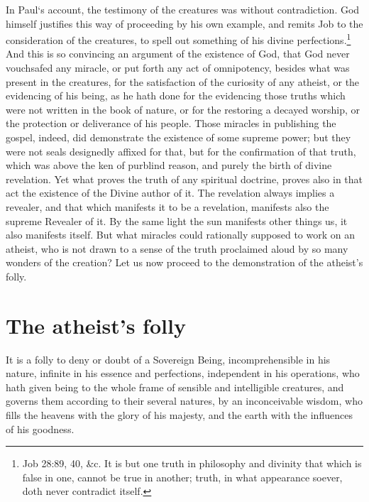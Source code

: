 \documentclass[a5paper]{book}
\begin{document}
In Paul‘s account, the testimony of the creatures was without contradiction. 
God himself justifies this way of proceeding by his own example, 
    and remits Job to the consideration of the creatures, 
    to spell out something of his divine perfections.\footnote{Job 28:89, 40, \&c. 
        It is but one truth in philosophy and divinity
        that which is false in one, 
        cannot be true in another;
        truth, in what appearance soever,
        doth never contradict itself.}
And this is so convincing an argument of the existence of God, 
    that God never vouchsafed any miracle,
    or put forth any act of omnipotency, 
    besides what was present in the creatures, 
    for the satisfaction of the curiosity of any atheist, 
    or the evidencing of his being, 
    as he hath done for the evidencing those truths 
    which were not written in the book of nature, 
    or for the restoring a decayed worship, 
    or the protection or deliverance of his people. 
Those miracles in publishing the gospel,
    indeed, did demonstrate the existence of some supreme power; 
    but they were not seals designedly affixed for that, 
    but for the confirmation of that truth, 
    which was above the ken of purblind reason,
    and purely the birth of divine revelation. 
Yet what proves the truth of any spiritual doctrine, 
    proves also in that act the existence of the Divine author of it. 
The revelation always implies a revealer, 
    and that which manifests it to be a revelation, 
    manifests also the supreme Revealer of it. 
By the same light the sun manifests other things us, 
    it also manifests itself. 
But what miracles could rationally supposed to work on an atheist, 
    who is not drawn to a sense of the truth proclaimed aloud 
    by so many wonders of the creation? 
Let us now proceed to the demonstration of the atheist’s folly.

\section{The atheist's folly}
It is a folly to deny or doubt of a Sovereign Being, 
    incomprehensible in his nature, 
    infinite in his essence and perfections, 
    independent in his operations, 
    who hath given being to the whole frame 
    of sensible and intelligible creatures, 
    and governs them according to their several natures,
    by an inconceivable wisdom,
    who fills the heavens with the glory of his majesty, 
    and the earth with the influences of his goodness.
\end{document}
